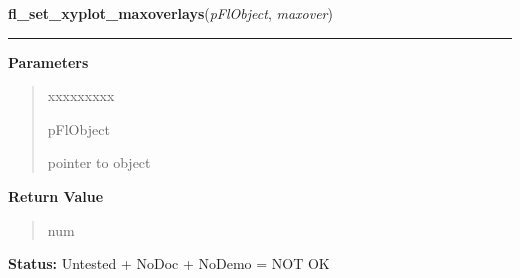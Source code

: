 \hspace{.8\funcindent}\begin{boxedminipage}{\funcwidth}

    \raggedright \textbf{fl\_set\_xyplot\_maxoverlays}(\textit{pFlObject}, \textit{maxover})

    \vspace{-1.5ex}

    \rule{\textwidth}{0.5\fboxrule}
\setlength{\parskip}{2ex}
\setlength{\parskip}{1ex}
      \textbf{Parameters}
      \vspace{-1ex}

      \begin{quote}
        \begin{Ventry}{xxxxxxxxx}

          \item[pFlObject]

          pointer to object

        \end{Ventry}

      \end{quote}

      \textbf{Return Value}
    \vspace{-1ex}

      \begin{quote}
      num

      \end{quote}

\textbf{Status:} Untested + NoDoc + NoDemo = NOT OK



    \end{boxedminipage}

    \label{xformslib:flxyplot:fl_add_xyplot_overlay}

    \vspace{0.5ex}

